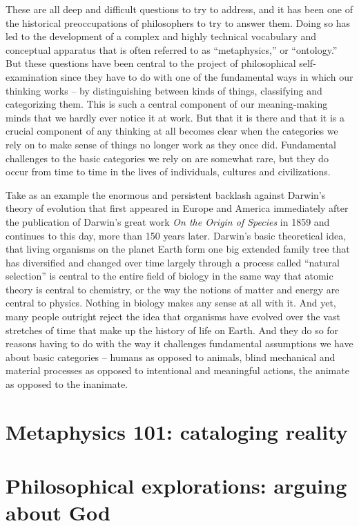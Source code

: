 \documentclass[
  12pt, openany]{book}
\begin{document}
These are all deep and difficult questions to try to address, and it has been one of the historical preoccupations of philosophers to try to answer them. Doing so has led to the development of a complex and highly technical vocabulary and conceptual apparatus that is often referred to as ``metaphysics,'' or ``ontology.'' But these questions have been central to the project of philosophical self-examination since they have to do with one of the fundamental ways in which our thinking works -- by distinguishing between kinds of things, classifying and categorizing them. This is such a central component of our meaning-making minds that we hardly ever notice it at work. But that it is there and that it is a crucial component of any thinking at all becomes clear when the categories we rely on to make sense of things no longer work as they once did. Fundamental challenges to the basic categories we rely on are somewhat rare, but they do occur from time to time in the lives of individuals, cultures and civilizations.

Take as an example the enormous and persistent backlash against Darwin's theory of evolution that first appeared in Europe and America immediately after the publication of Darwin's great work \emph{On the Origin of Species} in 1859 and continues to this day, more than 150 years later. Darwin's basic theoretical idea, that living organisms on the planet Earth form one big extended family tree that has diversified and changed over time largely through a process called ``natural selection'' is central to the entire field of biology in the same way that atomic theory is central to chemistry, or the way the notions of matter and energy are central to physics. Nothing in biology makes any sense at all with it. And yet, many people outright reject the idea that organisms have evolved over the vast stretches of time that make up the history of life on Earth. And they do so for reasons having to do with the way it challenges fundamental assumptions we have about basic categories -- humans as opposed to animals, blind mechanical and material processes as opposed to intentional and meaningful actions, the animate as opposed to the inanimate.

\hypertarget{metaphysics-101-cataloging-reality}{%
\section{Metaphysics 101: cataloging reality}\label{metaphysics-101-cataloging-reality}}

\hypertarget{philosophical-explorations-arguing-about-god}{%
\section{Philosophical explorations: arguing about God}\label{philosophical-explorations-arguing-about-god}}
\end{document}
